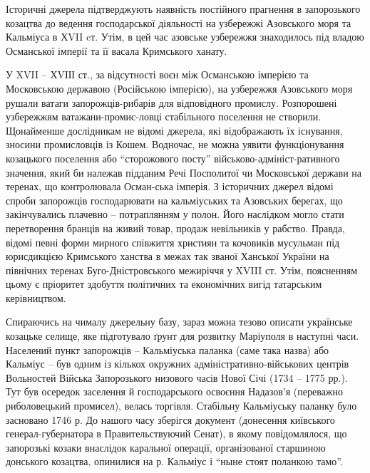 Історичні джерела підтверджують наявність постійного прагнення в запорозького
козацтва до ведення господарської діяльності на узбережжі Азовського моря та
Кальміуса в ХVII cт. Утім, в цей час азовське узбережжя знаходилось під владою
Османської імперії та її васала Кримського ханату. 

У XVII – ХVІІІ ст., за  відсутності воєн між Османською імперією та Московською
державою (Російською імперією), на узбережжя Азовського моря рушали ватаги
запорожців-рибарів для відповідного промислу. Розпорошені узбережжям
ватажани-промис\hyp{}ловці стабільного поселення не створили. Щонайменше дослідникам
не відомі джерела, які відображають їх існування, зносини промисловців із
Кошем. Водночас, не можна уявити функціонування козацького поселення або
\enquote{сторожового посту} військово-адмініст\hyp{}ративного значення, який би належав
підданим Речі Посполитої чи Московської держави на теренах, що контролювала
Осман\hyp{}ська імперія. З історичних джерел відомі спроби запорожців господарювати
на кальміуських та Азовських берегах, що закінчувались плачевно – потраплянням
у полон. Його наслідком могло стати перетворення бранців на живий товар, продаж
невільників у рабство. Правда, відомі певні форми мирного співжиття християн та
кочовиків мусульман під юрисдикцією Кримського ханства в межах так званої
Ханської України на північних теренах Буго-Дністровського межиріччя у XVIII ст.
Утім, поясненням цьому є пріоритет здобуття політичних та економічних вигід
татарським керівництвом.


Спираючись на чималу джерельну базу, зараз можна тезово описати українське
козацьке селище, яке підготувало ґрунт для розвитку Маріуполя в наступні часи.
Населений пункт запорожців – Кальміуська паланка (саме така назва) або Кальміус
– був одним із кількох окружних адміністративно-військових центрів Вольностей
Війська Запорозького низового часів Нової Січі (1734 – 1775 рр.). Тут був
осередок заселення й господарського освоєння Надазов'я (переважно риболовецький
промисел), велась торгівля. Стабільну Кальміуську паланку було засновано 1746
р.  До нашого часу зберігся документ (донесення київського генерал-губернатора
в Правительствуючий Сенат), в якому повідомлялося, що запорозькі козаки
внаслідок каральної операції, організованої старшиною донського козацтва,
опинилися на р. Кальміус і \enquote{ныне стоят поланкою тамо}.


